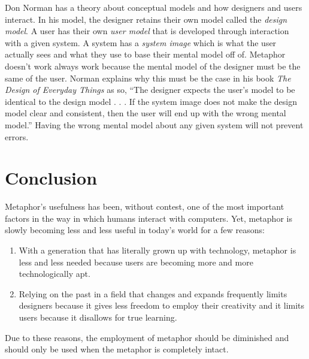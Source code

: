 \documentclass[11pt, oneside]{article}   	%
\begin{document}
Don Norman has a theory about conceptual models and how designers and users interact. In his model, the designer retains their own model called the \textit{design model}. A user has their own \textit{user model} that is developed through interaction with a given system. A system has a \textit{system image} which is what the user actually sees and what they use to base their mental model off of.
Metaphor doesn't work always work because the mental model of the designer must be the same of the user. Norman explains why this must be the case in his book \textit{The Design of Everyday Things} as so, ``The designer expects the user's model to be identical to the design model . . . If the system image does not make the design model clear and consistent, then the user will end up with the wrong mental model.''\cite{design-everyday} Having the wrong mental model about any given system will not prevent errors.

\section{Conclusion}
Metaphor's usefulness has been, without contest, one of the most important factors in the way in which humans interact with computers. Yet, metaphor is slowly becoming less and less useful in today's world for a few reasons:
\begin{enumerate}
\item With a generation that has literally grown up with technology, metaphor is less and less needed because users are becoming more and more technologically apt.
\item Relying on the past in a field that changes and expands frequently limits designers because it gives less freedom to employ their creativity and it limits users because it disallows for true learning.
\end{enumerate}
Due to these reasons, the employment of metaphor should be diminished and should only be used when the metaphor is completely intact.

\pagebreak


\end{document}
